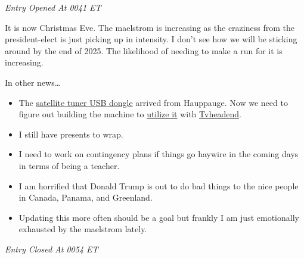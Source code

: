 \emph{Entry Opened At 0041 ET}

It is now Christmas Eve.  The maelstrom is increasing as the craziness from the president-elect is just picking up in intensity.  I don't see how we will be sticking around by the end of 2025.  The likelihood of needing to make a run for it is increasing.

In other news\ldots 

\begin{itemize}
    \item The \href{https://www.hauppauge.com/pages/webstore2/webstore_pctv461e.html}{satellite tuner USB dongle} arrived from Hauppauge.  Now we need to figure out building the machine to \href{https://www.linuxtv.org/wiki/index.php/Pinnacle_PCTV_DVB-S2_Stick_(461e)}{utilize it} with \href{https://tvheadend.org/p/downloads}{Tvheadend}.  
    \item I still have presents to wrap.
    \item I need to work on contingency plans if things go haywire in the coming days in terms of being a teacher.
    \item I am horrified that Donald Trump is out to do bad things to the nice people in Canada, Panama, and Greenland.
    \item Updating this more often should be a goal but frankly I am just emotionally exhausted by the maelstrom lately.
\end{itemize}

\emph{Entry Closed At 0054 ET}
